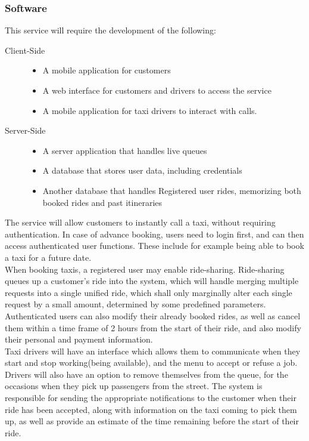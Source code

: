 	\subsubsection{Software}
		This service will require the development of the following:
		\begin{description}
			\item[Client-Side] \hfill
				\begin{itemize}
					\item A mobile application for customers
					\item A web interface for customers and drivers to access the service
					\item A mobile application for taxi drivers to interact with calls.
				\end{itemize}
			\item[Server-Side] \hfill
				\begin{itemize}
					\item A server application that handles live queues
					\item A database that stores user data, including credentials
					\item Another database that handles Registered user rides, memorizing both booked rides and past itineraries
				\end{itemize}
		\end{description}
		The service will allow customers to instantly call a taxi, without requiring authentication. In case of advance booking, users need to login
		first, and can then access authenticated user functions. These include for example being able to book a taxi for a future date.\\
		When booking taxis, a registered user may enable ride-sharing. Ride-sharing queues up a customer's ride into the system, which will handle merging multiple requests into
		a single unified ride, which shall only marginally alter each single request by a small amount, determined by some predefined parameters.\\
		Authenticated users can also modify their already booked rides, as well as cancel them within a time frame of 2 hours from the start of their ride, and also modify
		their personal and payment information.\\
		Taxi drivers will have an interface which allows them to communicate when they start and stop working(being available), and the menu to accept or refuse a 
		job. Drivers will also have an option to remove themselves from the queue, for the occasions when they pick up passengers from the street.
		The system is responsible for sending the appropriate notifications to the customer when their ride has been accepted, along with information
		on the taxi coming to pick them up,	as well as provide an estimate of the time remaining before the start of their ride.
